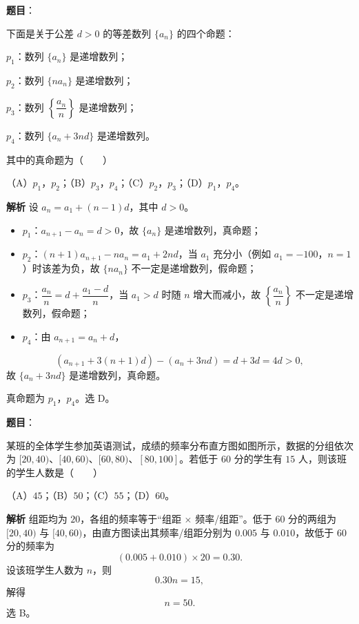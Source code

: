 \begin{answer}

\textbf{题目}：

下面是关于公差 $d>0$ 的等差数列 $\{a_n\}$ 的四个命题：

$p_1$：数列 $\{a_n\}$ 是递增数列；

$p_2$：数列 $\{na_n\}$ 是递增数列；

$p_3$：数列 $\left\{\dfrac{a_n}{n}\right\}$ 是递增数列；

$p_4$：数列 $\{a_n+3nd\}$ 是递增数列。

其中的真命题为\mbox{（　　）}

（A）$p_1$，$p_2$；（B）$p_3$，$p_4$；（C）$p_2$，$p_3$；（D）$p_1$，$p_4$。

\textbf{解析}
设 $a_n=a_1+(n-1)d$，其中 $d>0$。

\begin{itemize}
\item $p_1$：$a_{n+1}-a_n=d>0$，故 $\{a_n\}$ 是递增数列，真命题；
\item $p_2$：$(n+1)a_{n+1}-na_n=a_1+2nd$，当 $a_1$ 充分小（例如 $a_1=-100$，$n=1$）时该差为负，故 $\{na_n\}$ 不一定是递增数列，假命题；
\item $p_3$：$\dfrac{a_n}{n}=d+\dfrac{a_1-d}{n}$，当 $a_1>d$ 时随 $n$ 增大而减小，故 $\left\{\dfrac{a_n}{n}\right\}$ 不一定是递增数列，假命题；
\item $p_4$：由 $a_{n+1}=a_n+d$，
\end{itemize}
\nopagebreak[4]
\[(a_{n+1}+3(n+1)d)-(a_n+3nd)=d+3d=4d>0,\]
故 $\{a_n+3nd\}$ 是递增数列，真命题。

真命题为 $p_1$，$p_4$。选 D。


\end{answer}
\begin{answer}

\textbf{题目}：

某班的全体学生参加英语测试，成绩的频率分布直方图如图所示，数据的分组依次为 $[20,40)$、$[40,60)$、$[60,80)$、$[80,100]$。若低于 $60$ 分的学生有 $15$ 人，则该班的学生人数是\mbox{（　　）}
\nopagebreak[4]
\begin{center}\end{center}
\nopagebreak[4]
（A）$45$；（B）$50$；（C）$55$；（D）$60$。

\textbf{解析}
组距均为 $20$，各组的频率等于“组距 $\times$ 频率/组距”。低于 $60$ 分的两组为 $[20,40)$ 与 $[40,60)$，由直方图读出其频率/组距分别为 $0.005$ 与 $0.010$，故低于 $60$ 分的频率为
\nopagebreak[4]
\[(0.005+0.010)\times20=0.30.\]
设该班学生人数为 $n$，则
\nopagebreak[4]
\[0.30n=15,\]
解得
\nopagebreak[4]
\[n=50.\]
选 B。


\end{answer}
